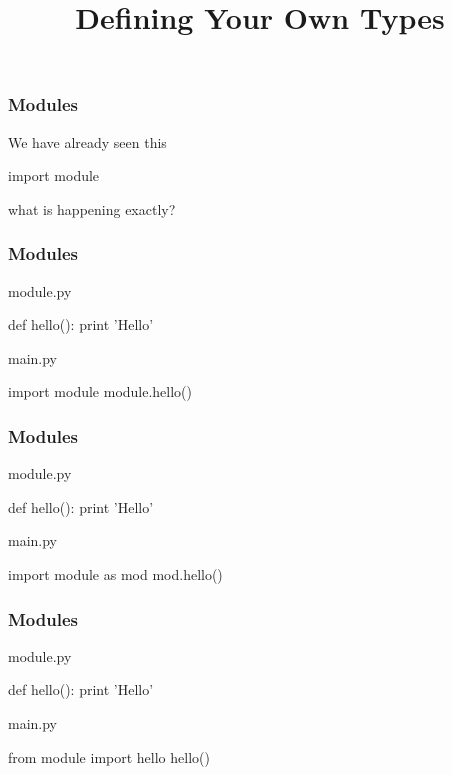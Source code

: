 
\title[Python III]{Defining Your Own Types}


\frame{\maketitle}


\begin{frame}[fragile]
\frametitle{Modules}
We have already seen this
\begin{python}
import module
\end{python}

what is happening exactly?
\end{frame}

\begin{frame}[fragile]
\frametitle{Modules}

\begin{block}{module.py}
\begin{python}
def hello():
    print 'Hello'
\end{python}
\end{block}

\begin{block}{main.py}
\begin{python}
import module
module.hello()
\end{python}
\end{block}

\end{frame}

\begin{frame}[fragile]
\frametitle{Modules}

\begin{block}{module.py}
\begin{python}
def hello():
    print 'Hello'
\end{python}
\end{block}

\begin{block}{main.py}
\begin{python}
import module as mod
mod.hello()
\end{python}
\end{block}

\end{frame}

\begin{frame}[fragile]
\frametitle{Modules}

\begin{block}{module.py}
\begin{python}
def hello():
    print 'Hello'
\end{python}
\end{block}

\begin{block}{main.py}
\begin{python}
from module import hello
hello()
\end{python}
\end{block}

\end{frame}

